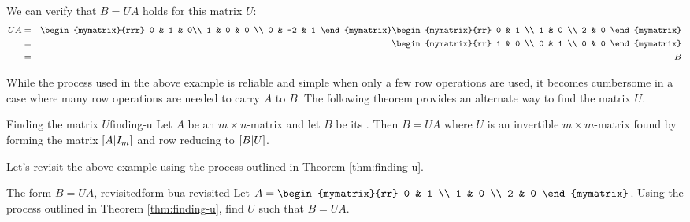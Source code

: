 \begin{solution}
We can verify that $B = UA$ holds for this matrix $U$:
\begin{eqnarray*}
UA &=& \begin{mymatrix}{rrr}
0 & 1 & 0\\
1 & 0 & 0 \\
0 & -2  & 1 
\end{mymatrix}
\begin{mymatrix}{rr}
0 & 1 \\
1 & 0 \\
2 & 0
\end{mymatrix} \\
&=& \begin{mymatrix}{rr}
1 & 0 \\
0 & 1 \\
0 & 0 
\end{mymatrix} \\
&=& B 
\end{eqnarray*} 
\end{solution}

While the process used in the above example is reliable and simple when only a few row operations are used, it becomes cumbersome in a case where many row operations are needed to carry $A$ to $B$. The following theorem provides an alternate way to find the matrix $U$. 

\begin{theorem}{Finding the matrix $U$}{finding-u}
Let $A$ be an $m \times n$-matrix and let $B$ be its {\rref}. Then $B = UA$ where $U$ is an invertible $m \times m$-matrix found by forming the matrix $ \left[A | I_m \right]$ and row reducing to $\left[B | U \right]$. 
\end{theorem}

Let's revisit the above example using the process outlined in Theorem \ref{thm:finding-u}.

\begin{example}{The form $B=UA$, revisited}{form-bua-revisited}
Let $A = \begin{mymatrix}{rr} 
0 & 1 \\
1 & 0 \\
2 & 0 
\end{mymatrix}$. Using the process outlined in Theorem \ref{thm:finding-u}, find $U$ such that $B=UA$. 
\end{example}

